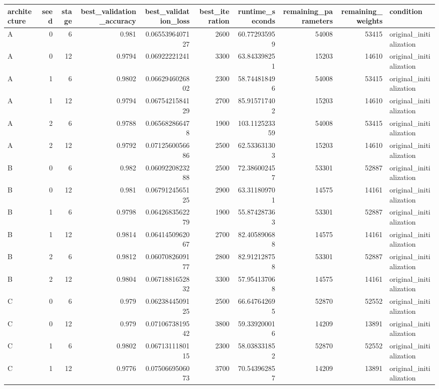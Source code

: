 \begin{tabular}{lrrrrrrrrl}
\toprule
architecture & seed & stage & best\_validation\_accuracy & best\_validation\_loss & best\_iteration & runtime\_seconds & remaining\_parameters & remaining\_weights & condition \\
\midrule
A & 0 & 6 & 0.981 & 0.0655396407127 & 2600 & 60.772935959 & 54008 & 53415 & original\_initialization \\
A & 0 & 12 & 0.9794 & 0.06922221241 & 3300 & 63.843398251 & 15203 & 14610 & original\_initialization \\
A & 1 & 6 & 0.9802 & 0.0662946026802 & 2300 & 58.744818496 & 54008 & 53415 & original\_initialization \\
A & 1 & 12 & 0.9794 & 0.0675421584129 & 2700 & 85.915717402 & 15203 & 14610 & original\_initialization \\
A & 2 & 6 & 0.9788 & 0.065682866478 & 1900 & 103.112523359 & 54008 & 53415 & original\_initialization \\
A & 2 & 12 & 0.9792 & 0.0712560056686 & 2500 & 62.533631303 & 15203 & 14610 & original\_initialization \\
B & 0 & 6 & 0.982 & 0.0609220823288 & 2500 & 72.386002457 & 53301 & 52887 & original\_initialization \\
B & 0 & 12 & 0.981 & 0.0679124565125 & 2900 & 63.311809701 & 14575 & 14161 & original\_initialization \\
B & 1 & 6 & 0.9798 & 0.0642683562279 & 1900 & 55.874287363 & 53301 & 52887 & original\_initialization \\
B & 1 & 12 & 0.9814 & 0.0641450962067 & 2700 & 82.405890688 & 14575 & 14161 & original\_initialization \\
B & 2 & 6 & 0.9812 & 0.0607082609177 & 2800 & 82.912128758 & 53301 & 52887 & original\_initialization \\
B & 2 & 12 & 0.9804 & 0.0671881652832 & 3300 & 57.954137068 & 14575 & 14161 & original\_initialization \\
C & 0 & 6 & 0.979 & 0.0623844509125 & 2500 & 66.647642695 & 52870 & 52552 & original\_initialization \\
C & 0 & 12 & 0.979 & 0.0710673819542 & 3800 & 59.339200016 & 14209 & 13891 & original\_initialization \\
C & 1 & 6 & 0.9802 & 0.0671311180115 & 2300 & 58.038331852 & 52870 & 52552 & original\_initialization \\
C & 1 & 12 & 0.9776 & 0.0750669506073 & 3700 & 70.543962857 & 14209 & 13891 & original\_initialization \\

\end{tabular}
